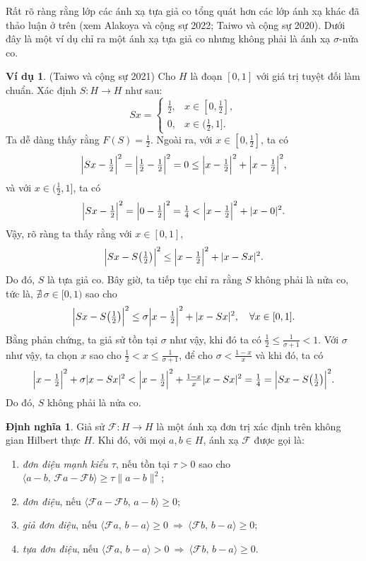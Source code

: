 \documentclass{MyBook}
\theoremstyle{plain}
\theoremstyle{definition}
\newtheorem{definition}[theorem]{Định nghĩa}
\newtheorem{example}[theorem]{Ví dụ}
\theoremstyle{remark}
\numberwithin{equation}{chapter}
\newcommand{\Fc}{\mathcal{F}}
\newcommand{\inp}[2]{\langle #1,\,#2\rangle}
\newcommand{\nm}[1]{\lVert #1\rVert}
\newcommand{\abs}[1]{\lvert #1\rvert}
\newcommand{\Fix}[1]{F(#1)}
\begin{document}
Rất rõ ràng rằng lớp các ánh xạ tựa giả co tổng quát hơn các lớp ánh xạ khác đã thảo luận ở trên (xem Alakoya và cộng sự 2022; Taiwo và cộng sự 2020). Dưới đây là một ví dụ chỉ ra một ánh xạ tựa giả co nhưng không phải là ánh xạ $\sigma$-nửa co.

\begin{example}
(Taiwo và cộng sự 2021) Cho $H$ là đoạn $[0,1]$ với giá trị tuyệt đối làm chuẩn. Xác định $S:H\to H$ như sau:
\[
Sx=\begin{cases}\tfrac{1}{2}, & x\in[0,\tfrac{1}{2}],\\[2pt] 0, & x\in(\tfrac{1}{2},1].\end{cases}
\]
Ta dễ dàng thấy rằng $\Fix{S}=\tfrac{1}{2}$. Ngoài ra, với $x\in[0,\tfrac{1}{2}]$, ta có
\[
\Bigl\lvert Sx-\tfrac{1}{2}\Bigr\rvert^2=\Bigl\lvert\tfrac{1}{2}-\tfrac{1}{2}\Bigr\rvert^2=0\le\Bigl\lvert x-\tfrac{1}{2}\Bigr\rvert^2+\Bigl\lvert x-\tfrac{1}{2}\Bigr\rvert^2,
\]
và với $x\in(\tfrac{1}{2},1]$, ta có
\[
\Bigl\lvert Sx-\tfrac{1}{2}\Bigr\rvert^2=\Bigl\lvert 0-\tfrac{1}{2}\Bigr\rvert^2=\tfrac{1}{4}<\Bigl\lvert x-\tfrac{1}{2}\Bigr\rvert^2+\abs{x-0}^2.
\]
Vậy, rõ ràng ta thấy rằng với $x\in[0,1]$,
\[
\Bigl\lvert Sx-S\bigl(\tfrac{1}{2}\bigr)\Bigr\rvert^2\le\Bigl\lvert x-\tfrac{1}{2}\Bigr\rvert^2+\abs{x-Sx}^2.
\]
Do đó, $S$ là tựa giả co. Bây giờ, ta tiếp tục chỉ ra rằng $S$ không phải là nửa co, tức là, $\nexists\,\sigma\in[0,1)$ sao cho
\[
\Bigl\lvert Sx-S\bigl(\tfrac{1}{2}\bigr)\Bigr\rvert^2\le\sigma\Bigl\lvert x-\tfrac{1}{2}\Bigr\rvert^2+\abs{x-Sx}^2,\quad\forall x\in[0,1].
\]
Bằng phản chứng, ta giả sử tồn tại $\sigma$ như vậy, khi đó ta có $\tfrac{1}{2}\le\tfrac{1}{\sigma+1}<1$. Với $\sigma$ như vậy, ta chọn $x$ sao cho $\tfrac{1}{2}<x\le\tfrac{1}{\sigma+1}$, để cho $\sigma<\tfrac{1-x}{x}$ và khi đó, ta có
\[
\Bigl\lvert x-\tfrac{1}{2}\Bigr\rvert^2+\sigma\abs{x-Sx}^2<\Bigl\lvert x-\tfrac{1}{2}\Bigr\rvert^2+\tfrac{1-x}{x}\abs{x-Sx}^2=\tfrac{1}{4}=\Bigl\lvert Sx-S\bigl(\tfrac{1}{2}\bigr)\Bigr\rvert^2.
\]
Do đó, $S$ không phải là nửa co.
\end{example}

\begin{definition}
Giả sử $\Fc:H\to H$ là một ánh xạ đơn trị xác định trên không gian Hilbert thực $H$. Khi đó, với mọi $a,b\in H$, ánh xạ $\Fc$ được gọi là:
\begin{enumerate}[label=(\roman*)]
\item \textit{đơn điệu mạnh kiểu $\tau$}, nếu tồn tại $\tau>0$ sao cho $\inp{a-b}{\Fc a-\Fc b}\ge\tau\nm{a-b}^2$;
\item \textit{đơn điệu}, nếu $\inp{\Fc a-\Fc b}{a-b}\ge 0$;
\item \textit{giả đơn điệu}, nếu $\inp{\Fc a}{b-a}\ge 0\ \Longrightarrow\ \inp{\Fc b}{b-a}\ge 0$;
\item \textit{tựa đơn điệu}, nếu $\inp{\Fc a}{b-a}>0\ \Longrightarrow\ \inp{\Fc b}{b-a}\ge 0$.
\end{enumerate}
\end{definition}
\end{document}

